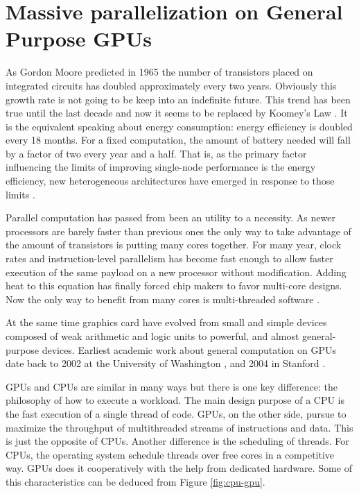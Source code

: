 \documentclass{article}
\begin{document}
\section{Massive parallelization on General Purpose GPUs}
\label{sec:parall_and_GPUs}

As Gordon Moore predicted in 1965 the number of transistors placed on
integrated circuits has doubled approximately every two years. %
Obviously this growth rate is not going to be keep into an indefinite future. This trend has been true until the last decade and now it seems to be replaced by Koomey's Law \cite{10.1109/MAHC.2010.28}. It is the equivalent speaking about energy consumption: energy efficiency is doubled every 18 months. For a fixed computation, the amount of battery needed will fall by a factor of two every year and a half. That is, as the primary factor influencing the limits of improving single-node performance is the energy efficiency, new heterogeneous architectures have emerged in response to those limits \cite{VetterHeterogeneous11}. 

Parallel computation has passed from been an utility to a
necessity. As newer processors are barely faster than previous ones 
the only way to take advantage of the amount of transistors is putting
many cores together. For many year, clock rates and instruction-level
parallelism has become fast enough to allow faster execution of the
same payload on a new processor without modification. Adding heat to
this equation has finally forced chip makers to favor multi-core
designs. Now the only way to benefit from many cores is multi-threaded
software \cite{6307773}. 

At the same time graphics card have evolved from small and simple
devices composed of weak arithmetic and logic units to powerful, and
almost general-purpose devices. Earliest academic work about general
computation on GPUs date back to 2002 at the University of Washington
\cite{Thompson:2002:UMG:774861.774894}, and 2004 in Stanford
\cite{Buck:2004:BGS:1015706.1015800}. %

GPUs and CPUs are similar in many ways but there is one key
difference: the philosophy of how to execute a workload. The main
design purpose of a CPU is the fast execution of a single thread of
code. GPUs, on the other side, pursue to maximize the throughput of
multithreaded streams of instructions and data. This is just the
opposite of CPUs. Another difference is the scheduling of threads. For
CPUs, the operating system schedule threads over free cores in a
competitive way. GPUs does it cooperatively with the help from
dedicated hardware. Some of this characteristics can be deduced from
Figure \ref{fig:cpu-gpu}. 
\end{document}
